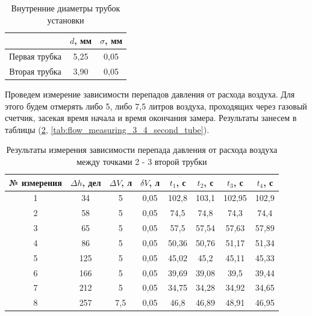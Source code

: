 \documentclass[12pt,a4paper]{article}
\begin{document}
\begin{table}[h!]
\centering
\begin{tabular}{|c|c|c|}
\hline
              & $d$, мм & $\sigma$, мм \\ \hline
Первая трубка & 5,25    & 0,05         \\ \hline
Вторая трубка & 3,90    & 0,05         \\ \hline
\end{tabular}
\caption{Внутренние диаметры трубок установки}
\label{tab:facilitys_tube_diam}
\end{table}

Проведем измерение зависимости перепадов давления от расхода воздуха. Для этого будем отмерять либо 5, либо 7,5 литров воздуха, проходящих через газовый счетчик, засекая время начала и время окончания замера. Результаты занесем в таблицы (\ref{tab:flow_measuring_2_3_second_tube}, \ref{tab:flow_measuring_3_4_second_tube}).

\begin{table}[h!]
\centering
\begin{tabular}{|c|c|c|c|c|c|c|c|}
\hline
№ измерения & $\Delta h$, дел & $\Delta V$, л & $\delta V$, л & $t_{1}$, с & $t_{2}$, с & $t_{3}$, с & $t_{4}$, с \\ \hline
1           & 34              & 5             & 0,05          & 102,8      & 103,1      & 102,95     & 102,9      \\ \hline
2           & 58              & 5             & 0,05          & 74,5       & 74,8       & 74,3       & 74,4       \\ \hline
3           & 65              & 5             & 0,05          & 57,5       & 57,54      & 57,63      & 57,89      \\ \hline
4           & 86              & 5             & 0,05          & 50,36      & 50,76      & 51,17      & 51,34      \\ \hline
5           & 125             & 5             & 0,05          & 45,02      & 45,2       & 45,11      & 45,33      \\ \hline
6           & 166             & 5             & 0,05          & 39,69      & 39,08      & 39,5       & 39,44      \\ \hline
7           & 212             & 5             & 0,05          & 34,75      & 34,28      & 34,92      & 34,65      \\ \hline
8           & 257             & 7,5           & 0,05          & 46,8       & 46,89      & 48,91      & 46,95      \\ \hline
\end{tabular}
\caption{Результаты измерения зависимости перепада давления от расхода воздуха между точками 2 - 3 второй трубки}
\label{tab:flow_measuring_2_3_second_tube}
\end{table}
\end{document}
